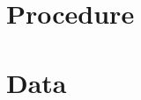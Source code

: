 \documentclass{article} %
\begin{document}










\section {Procedure}










\section {Data}
\end{document}
